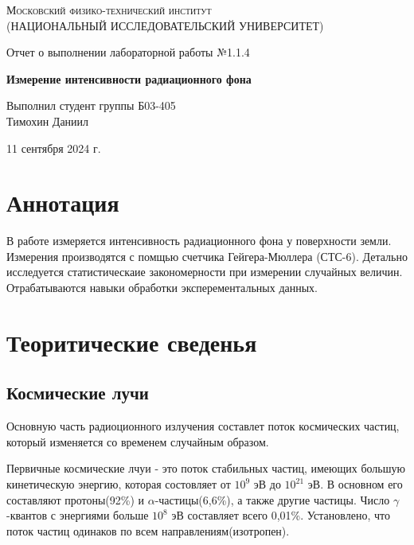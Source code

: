\documentclass[12pt,a4paper]{article}
\def \TITLE {Отчет о выполнении лабораторной работы №1.1.4}
\def \SUBTITLE {Измерение интенсивности радиационного фона}
\def \AUTHOR {Выполнил студент группы Б03-405\\ Тимохин Даниил}
\def \DATE {11 сентября 2024 г.}
\begin{document}
\begin{titlepage}
	\centering
	\vspace{5cm}
	{\scshape\large Московский физико-технический институт \\
	(НАЦИОНАЛЬНЫЙ ИССЛЕДОВАТЕЛЬСКИЙ УНИВЕРСИТЕТ)}
	
	\vspace{4cm}
	{\LARGE \TITLE}
	
	\vspace{1cm}
	{\Huge\bf \SUBTITLE }
	
	\vspace{1cm}
	\vfill
	
\begin{flushright}
	{\LARGE \AUTHOR}
\end{flushright}
	

	\vfill

	\DATE
\end{titlepage}

\newpage

\fontsize{12}{14}\selectfont

\section{ Аннотация}
В работе измеряется интенсивность радиационного фона у поверхности земли. Измерения производятся с помщью счетчика Гейгера-Мюллера (СТС-6). Детально исследуется статистическаие закономерности при измерении случайных величин. Отрабатываются навыки обработки эксперементальных данных.

\section{ Теоритические сведенья}

\subsection{ Космические лучи}
Основную часть радиоционного излучения составлет поток космических частиц, который изменяется со временем случайным образом.

Первичные космические лчуи - это поток стабильных частиц, имеющих большую кинетическую энергию, которая состовляет от $10^9$ эВ до $10^{21}$ эВ. В основном его составляют протоны(92\%) и $\alpha$-частицы(6,6\%), а также другие частицы. Число $\gamma$-квантов с энергиями больше $10^8$ эВ составляет всего 0,01\%.
Установлено, что поток частиц одинаков по всем направлениям(изотропен).
\end{document}
